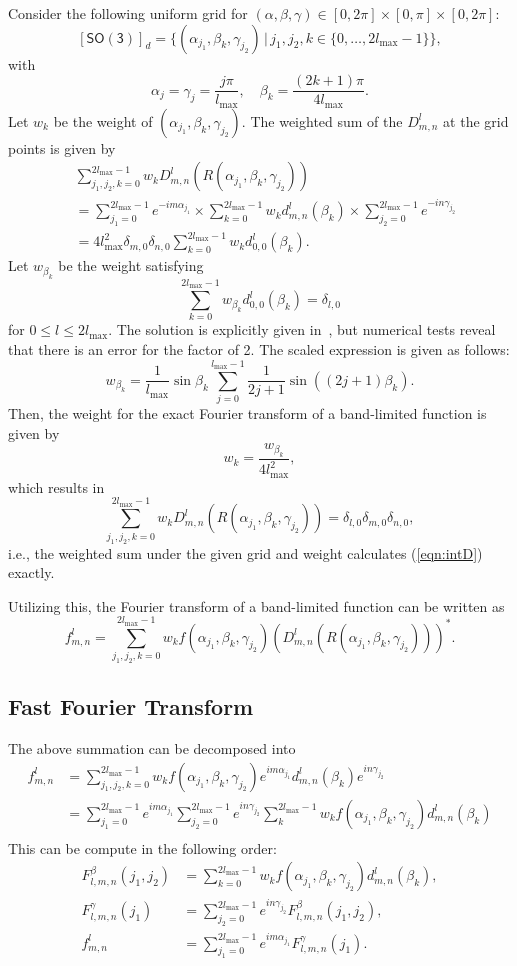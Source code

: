 \documentclass{ieeetran}
\newcommand{\refeqn}[1]{(\ref{eqn:#1})}
\newcommand{\SO}{\ensuremath{\mathsf{SO(3)}}}
\begin{document}
Consider the following uniform grid for $(\alpha,\beta,\gamma)\in[0,2\pi]\times[0,\pi]\times[0,2\pi]$:
\[
[\SO]_d=\{(\alpha_{j_1},\beta_k,\gamma_{j_2})\,|\, j_1,j_2,k\in\{0,\ldots, 2l_{\max}-1\}\},
\]
with
\[
\alpha_j=\gamma_j= \frac{j\pi}{l_{\max}},\quad \beta_k = \frac{(2k+1)\pi}{4l_{\max}}.
\]
Let $w_k$ be the weight of $(\alpha_{j_1},\beta_k,\gamma_{j_2})$. The weighted sum of the $D^l_{m,n}$ at the grid points is given by
\begin{align*}
&\sum_{j_1,j_2,k=0}^{2l_{\max}-1} w_k D^l_{m,n}(R(\alpha_{j_1},\beta_k,\gamma_{j_2}))\\
& =  \sum_{j_1=0}^{2l_{\max}-1}e^{-im\alpha_{j_1}}\times  \sum_{k=0}^{2l_{\max}-1} w_k d^l_{m,n} (\beta_k) \times \sum_{j_2=0}^{2l_{\max}-1} e^{-in\gamma_{j_2}}\\
& =  4l_{\max}^2 \delta_{m,0}\delta_{n,0}\sum_{k=0}^{2l_{\max}-1} w_k d^l_{0,0} (\beta_k).
\end{align*}
Let $w_{\beta_k}$ be the weight satisfying
\[
\sum_{k=0}^{2l_{\max}-1} w_{\beta_k} d^l_{0,0} (\beta_k)=\delta_{l,0}
\]
for $0\leq l\leq 2l_{\max}$. The solution is explicitly given in~\cite{KosRocJFAA08}, but  numerical tests reveal that there is an error for the factor of 2. The scaled expression is given as follows:
\[
w_{\beta_k}=\frac{1}{l_{\max}}\sin\beta_k \sum_{j=0}^{l_{\max}-1}\frac{1}{2j+1}\sin((2j+1)\beta_k).
\]
Then, the weight for the exact Fourier transform of a band-limited function is given by
\[
w_k = \frac{w_{\beta_k}} {4l_{\max}^2},
\]
which results in
\[
\sum_{j_1,j_2,k=0}^{2l_{\max}-1} w_k D^l_{m,n}(R(\alpha_{j_1},\beta_k,\gamma_{j_2}))=\delta_{l,0}\delta_{m,0}\delta_{n,0},
\]
i.e., the weighted sum under the given grid and weight calculates \refeqn{intD} exactly. 

Utilizing this, the Fourier transform of a band-limited function can be written as
\[
f^l_{m,n}=\sum_{j_1,j_2,k=0}^{2l_{\max}-1} w_k f(\alpha_{j_1},\beta_k,\gamma_{j_2})
(D^l_{m,n}(R(\alpha_{j_1},\beta_k,\gamma_{j_2})))^*.
\]

\subsection{Fast Fourier Transform}
The above summation can be decomposed into
\begin{align*}
f^l_{m,n}&=\sum_{j_1,j_2,k=0}^{2l_{\max}-1} w_k f(\alpha_{j_1},\beta_k,\gamma_{j_2})
e^{im\alpha_{j_1}} d^l_{m,n}(\beta_k) e^{in\gamma_{j_2}}\\
&=\sum_{j_1=0}^{2l_{\max}-1} 
e^{im\alpha_{j_1}}\sum_{j_2=0}^{2l_{\max}-1} e^{in\gamma_{j_2}} \sum_{k}^{2l_{\max}-1}w_k f(\alpha_{j_1},\beta_k,\gamma_{j_2})d^l_{m,n}(\beta_k) \\
\end{align*}
This can be compute in the following order:
\begin{align*}
F^{\beta}_{l,m,n}(j_1,j_2)&=\sum_{k=0}^{2l_{\max}-1}w_k f(\alpha_{j_1},\beta_k,\gamma_{j_2})d^l_{m,n}(\beta_k),\\
F^{\gamma}_{l,m,n}(j_1)&=\sum_{j_2=0}^{2l_{\max}-1}e^{in\gamma_{j_2}}F^{\beta}_{l,m,n}(j_1,j_2),\\
f^l_{m,n} & = \sum_{j_1=0}^{2l_{\max}-1} e^{im\alpha_{j_1}}F^{\gamma}_{l,m,n}(j_1).
\end{align*}



\end{document}
